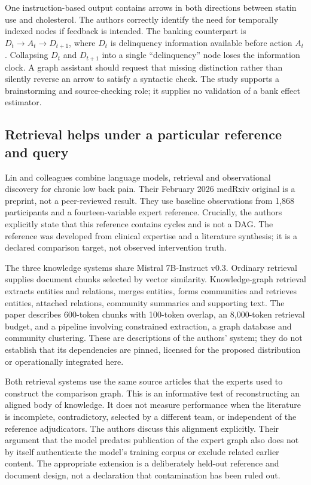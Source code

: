 One instruction-based output contains arrows in both directions between statin
use and cholesterol. The authors correctly identify the need for temporally
indexed nodes if feedback is intended. The banking counterpart is
\(D_t\to A_t\to D_{t+1}\), where \(D_t\) is delinquency information available
before action \(A_t\). Collapsing \(D_t\) and \(D_{t+1}\) into a single
``delinquency'' node loses the information clock. A graph assistant should request
that missing distinction rather than silently reverse an arrow to satisfy a
syntactic check. The study supports a brainstorming and source-checking role;
it supplies no validation of a bank effect estimator.

\subsection{Retrieval helps under a particular reference and query}
\label{exec22:domain-retrieval}

Lin and colleagues combine language models, retrieval and observational discovery
for chronic low back pain. Their February 2026 medRxiv original is a preprint,
not a peer-reviewed result. They use baseline observations from 1,868 participants
and a fourteen-variable expert reference. Crucially, the authors explicitly state
that this reference contains cycles and is not a DAG. The reference was developed
from clinical expertise and a literature synthesis; it is a declared comparison
target, not observed intervention truth. \citep{exec22_domain_lin}

The three knowledge systems share Mistral 7B-Instruct v0.3. Ordinary retrieval
supplies document chunks selected by vector similarity. Knowledge-graph retrieval
extracts entities and relations, merges entities, forms communities and retrieves
entities, attached relations, community summaries and supporting text. The paper
describes 600-token chunks with 100-token overlap, an 8,000-token retrieval budget,
and a pipeline involving constrained extraction, a graph database and community
clustering. These are descriptions of the authors' system; they do not establish
that its dependencies are pinned, licensed for the proposed distribution or
operationally integrated here. \citep{exec22_domain_lin}

Both retrieval systems use the same source articles that the experts used to
construct the comparison graph. This is an informative test of reconstructing
an aligned body of knowledge. It does not measure performance when the literature
is incomplete, contradictory, selected by a different team, or independent of the
reference adjudicators. The authors discuss this alignment explicitly. Their
argument that the model predates publication of the expert graph also does not
by itself authenticate the model's training corpus or exclude related earlier
content. The appropriate extension is a deliberately held-out reference and
document design, not a declaration that contamination has been ruled out.

